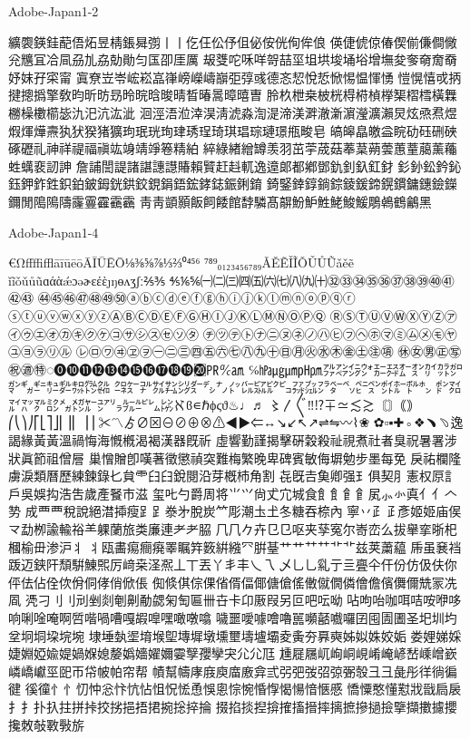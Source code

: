 Adobe-Japan1-2

纊褜鍈銈蓜俉炻昱棈鋹曻彅⼁丨仡仼伀伃伹佖侒侊侚侔俍
偀倢俿倞偆偰偂傔僴僘兊兤冝冾凬刕劜劦勀勛匀匤卲厓厲
叝﨎咜咊咩哿喆坙坥垬埈埇﨏增墲夋奓奛奝奣妤妺孖寀甯
寘尞岦岺峵崧嵓嵂嵭嶸嶹巐弡弴彧德忞恝悅悊惞惕愠惲愑
愷愰憘戓抦揵摠撝擎敎昀昕昉昮昤晥晗晙晴晳暙暠暲暿曺
朎杦枻桒柀桄棏﨓楨﨔榘槢樰橫橆橳橾櫢櫤毖氿汜沆汯泚
洄涇浯涖涬淏淸淲淼渹湜渧渼溿澈澵濵瀅瀇瀨炅炫焏焄煜
煆煇燁燾犱犾猤猪獷玽珉珖珣珒琇珵琦琪琩琮璉璟甁畯皂
皜皞皛皦益睆劯砡硎硤硺礰礼神祥禔福禛竑竧靖竫箞精絈
綷綠緖繒罇羡羽茁荢荿菇菶葈蒴蕓蕙蕫﨟薰蘒﨡蠇裵訒訷
詹誧誾諟諸諶譓譿賰賴贒赶﨣軏逸遧郞都鄕鄧釚釗釞釭釮
釤釥鈆鈐鈊鈺鉀鈼鉎鉙鉑鈹鉧銧鉷鉸鋧鋗鋙鋐﨧鋕鋠鋓錥
錡鋻﨨錞鋿錝錂鍰鍗鎤鏆鏞鏸鐱鑅鑈閒﨩隝隯霳霻靃靍靏
⾭靑顗顥飯飼餧館馞驎髙髜魵魲鮏鮱鮻鰀鵰鵫鶴鸙黑

Adobe-Japan1-4

€ΩﬀﬃﬄāīūēōĀĪŪĒŌ⅛⅜⅝⅞⅓⅔⁰⁴⁵⁶
⁷⁸⁹₀₁₂₃₄₅₆₇₈₉ǍĚẼǏĨǑǓŮŨǎěẽ
ǐĩǒǔůũɑάὰǽɔəɚɛέὲȷŋɵʌʒʃː⅖⅗
⅘⅙⅚㈠㈡㈢㈣㈤㈥㈦㈧㈨㈩㉜㉝㉞㉟㊱㊲㊳㊴㊵㊶㊷㊸
㊹㊺㊻㊼㊽㊾㊿ⓐⓑⓒⓓⓔⓕⓖⓗⓘⓙⓚⓛⓜⓝⓞⓟⓠⓡ
ⓢⓣⓤⓥⓦⓧⓨⓩⒶⒷⒸⒹⒺⒻⒼⒽⒾⒿⓀⓁⓂⓃⓄⓅⓆ
ⓇⓈⓉⓊⓋⓌⓍⓎⓏ㋐㋑㋒㋓㋔㋕㋖㋗㋘㋙㋚㋛㋜㋝㋞㋟
㋠㋡㋢㋣㋤㋥㋦㋧㋨㋩㋪㋫㋬㋭㋮㋯㋰㋱㋲㋳㋴㋵㋶㋷㋸
㋹㋺㋻㋼㋽㋾㊀㊁㊂㊃㊄㊅㊆㊇㊈㊉㊐㊊㊋㊌㊍㊎㊏㊟㊠
㊡㊛㊚㊣㊢㊗㊜㊕◌⓿❿⓫⓬⓭⓮⓯⓰⓱⓲⓳⓴⃞㏚℀㏂
℅㍱㎍㎛㏗㏘㌁㌂㌄㌆㌈㌇㌊㌉㌋㌌㌎㌏㌐㌑㌒㌓㌗㌙㌚
㌛㌜㌝㌟㌠㌡㌤㌥㌨㌩㌭㌮㌯㌰㌲㌴㌵㌼㌷㌸㌺㌽㍁㌾㌿
㍀㍃㍄㍅㍆㍈㍋㍌㍏㍐㍒㍔㍓㍕㍖ℵϐ∊ℏϕϛϑ♨♩♬
〻〳〴〵‼⁉∓≃≲≳〘〙｟｠⎛⎝⎞⎠⎡⎣⎤⎦⎜⎟⎢
⎥⎪✂〽ゟ∅⊠⊖⊘⊕⊗⚠◀▶⇐↔↘↙↖↗⇌⇋〰⌇❀
✿▫▪✚◦❖﹅﹆逸謁緣⿈黃溫禍悔海慨槪渴褐漢器既祈
虛響勤謹揭擊硏穀殺祉視煮社者臭祝暑署涉狀眞節祖僧層
巢憎贈卽嘆著徵懲禎突難梅繁晚卑碑賓敏侮塀勉步墨每免
戾祐欄隆虜淚類曆歷練鍊錄𠤎貟⻗⺽𦥑銳閱沿芽槪杮⻆割
㐂旣𠮷𩵋卿强⺩俱契⺼憲权𠩤訁戶吳娛抅浩吿歲產䬸巿滋
玺𠮟勺爵周将⺌⺍尙𠀋宂城⻝⻟飠⻞𩙿㞍⺗㣺真⺅亻𠆢㔟
成⻃覀稅說絕澘揷瘦⻊𧾷𣳾㐧脫炭⺮彫潮圡𡈽冬糖吞㮈內
寧丷⺪𤴔彥姬姬庙㑨龴勐栁諭輸𥙿⺷躶蘭旅类廉連⺹耂𦚰
⺇𠘨𠂊卉⺋㔾呕夹孶寃尔㟢峦么拔𦦙挛晣杞槶榆毌渗沪⺦
丬瓯畵痬癎㾱睪瞩筓䉤絣繈⺳腁䑓艹⺾艹⺿艹⻀兹荚䔥藴
𠂰虽㐮裆䟦迈𨦇𨸗頹騈鯟𤋮厉﨑桒𣲾𠘑丄丅丟丫丯丰乀乁
乄⺃乚乿亍亖亹仐仠份仿伋伕你伻佉佔佺佽佾侗侾俏俽倀
倁倐倛倧倮偗偦偪倻傏傖傜僌僦僩僯儈儋儐儛儞兟冡冼凮
凴刁⺉刂刓剉剡剦劓勈勰匊匋匾卌卋卡卬厫叚另叵吧呍呦
呫呴咍咖咡咭咹咿哆响唎唫唵啊啠喈喎嘈嘎嘏嘷嘿噉噋噏
噦噩噯噱噲嚕嚚嚬嚭嚱囉囝囤圊圕圣圯圳圴坌坰垌垜垸埦
埭埵埶埿堉堠堲塼墀墩壎壐壔壚壩夌夤夯奡奭姊姒姝姣姤
娄娌娣婇婕婣婭婾媞媧媬媳嫠嬀嬙嬥嬭孁孼孾孿宊⺏尣尫
尰屣屩屼峋峒峴崤崦嵃嵆嵊嶒嶔嶙嶠巘巠巸帀帒帔帕帘帮
幘幫幬庨庪庾庿廒弇弎弜弝弢弨弶弻彀⼹彐彘彤徉徜徧徤
徯徸⺖忄忉忡忩忭忼怗怚怳恡恿悞悤悰惋惛惸愒愓愔愜慼
憍憟憨懂懟戕戩扃扆⺘扌扑扖拄拼挊挍挘挹捂捃捥捴捽掄
掇掐掞揑揜搉搐搢摔摛摭摻撾撿擥擷擻攄攖攙敇敧斁斅旂
